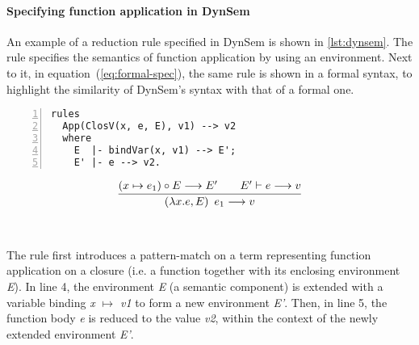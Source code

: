 \paragraph{Specifying function application in DynSem} An example of a reduction
rule specified in DynSem is shown in \cref{lst:dynsem}. The rule specifies the
semantics of function application by using an environment. Next to it, in
equation~(\ref{eq:formal-spec}), the same rule is shown in a formal syntax, to
highlight the similarity of DynSem's syntax with that of a formal one.

\begin{minipage}[t]{\linewidth}
\begin{minipage}{0.45\textwidth}
\begin{lstlisting}[language=dynsem,numbers=left]
rules
  App(ClosV(x, e, E), v1) --> v2
  where
    E  |- bindVar(x, v1) --> E';
    E' |- e --> v2.
\end{lstlisting}
\end{minipage}
\begin{minipage}{0.55\textwidth}
  \centering
  \begin{equation*}
    \infer{%
      \left(\lambda x.e, E\right)~e_1 \longrightarrow v%
    }{%
      (x \mapsto e_1) \circ E \longrightarrow E' &\quad E' \vdash e \longrightarrow v
    }
  \end{equation*}
\end{minipage}
\\
\begin{minipage}[t]{0.45\textwidth}
  \label{lst:dynsem}
\end{minipage}
\hspace{0.05\textwidth}
\begin{minipage}[t]{0.45\textwidth}
  \renewcommand*\figurename{Equation}
  \makeatletter
    \let\c@figure\c@equation
  \makeatother
  \label{eq:formal-spec}
\end{minipage}
\end{minipage}

The rule first introduces a pattern-match on a term representing function
application on a closure (i.e. a function together with its enclosing
environment \textit{E}). In line 4, the environment \textit{E} (a semantic
component) is extended with a variable binding \textit{x $\mapsto$ v1} to form a
new environment \textit{E'}. Then, in line 5, the function body \textit{e} is
reduced to the value \textit{v2}, within the context of the newly extended
environment \textit{E'}.

